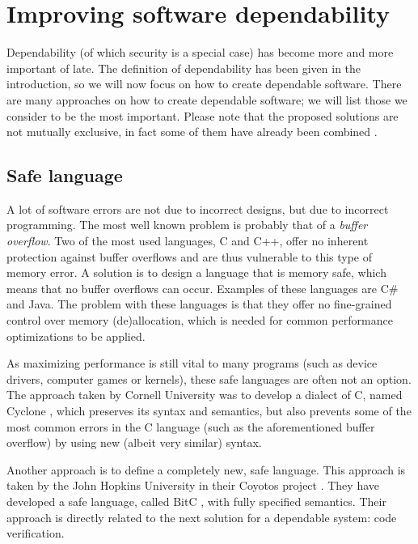 \section{Improving software dependability}
Dependability (of which security is a special case) has become more and more important of late. The definition of dependability has been given in the introduction, so we will now focus on how to create dependable software. There are many approaches on how to create dependable software; we will list those we consider to be the most important. Please note that the proposed solutions are not mutually exclusive, in fact some of them have already been combined \cite{hohmuth03applying,hunt05singularity}.

\subsection{Safe language}
A lot of software errors are not due to incorrect designs, but due to incorrect programming. The most well known problem is probably that of a \textsl{buffer overflow}. Two of the most used languages, C and C++, offer no inherent protection against buffer overflows and are thus vulnerable to this type of memory error. A solution is to design a language that is memory safe, which means that no buffer overflows can occur. Examples of these languages are C\# and Java. The problem with these languages is that they offer no fine-grained control over memory (de)allocation, which is needed for common performance optimizations to be applied.\emptyline

As maximizing performance is still vital to many programs (such as device drivers, computer games or kernels), these safe languages are often not an option. The approach taken by Cornell University was to develop a dialect of C, named Cyclone \cite{jim02cyclone}, which preserves its syntax and semantics, but also prevents some of the most common errors in the C language (such as the aforementioned buffer overflow) by using new (albeit very similar) syntax.\emptyline

Another approach is to define a completely new, safe language. This approach is taken by the John Hopkins University in their Coyotos project \cite{hopkings06coyotos}. They have developed a safe language, called BitC \cite{shapiro06bitc}, with fully specified semantics. Their approach is directly related to the next solution for a dependable system: code verification.

